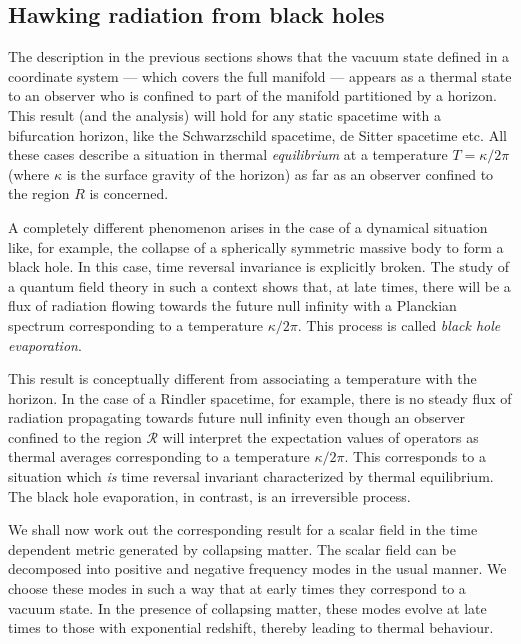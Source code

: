 \documentclass[12pt]{iopart}
\begin{document}
     
 
\subsection{Hawking radiation from black holes}\label{sec:hawrad}

The description in the previous sections shows that
the vacuum state defined in a coordinate system ---  which covers the full manifold --- appears
as a thermal state to an observer who is confined to part of the manifold
partitioned by a horizon. 
This result (and the analysis)  will hold for
any static spacetime 
with a bifurcation horizon, like the Schwarzschild spacetime, de Sitter spacetime etc.
All these cases describe a situation in    thermal \textit{equilibrium} at a temperature 
$T= \kappa/2\pi$ (where $\kappa$ is the surface gravity of the horizon) as far as an 
observer confined to the region $R$ is concerned.

A completely different phenomenon arises in the case of a dynamical situation like, for example, the collapse of  a spherically symmetric massive body to form a black hole.
In this case, time reversal invariance is explicitly broken.
The study of a quantum field theory in such a context shows that, at late times,
there will be a flux of radiation flowing towards the future null infinity
with a Planckian spectrum corresponding to a temperature $\kappa/2\pi$.
 This process is called \textit{black hole evaporation}.
 
 
 This result is conceptually different from associating a temperature with the horizon.
In the case of a Rindler spacetime, for example, there is no steady flux of radiation
propagating towards future null infinity even though an observer confined to
the region $\mathcal{R}$ will interpret the expectation values of operators as thermal averages
corresponding to a temperature $\kappa/2\pi$. This corresponds to a situation
which \textit{is} time reversal invariant characterized by thermal equilibrium.
The black hole evaporation, in contrast, is an irreversible process. 


We shall now work out the corresponding result for  a scalar field in the
time dependent  metric generated by
 collapsing matter. The scalar field can be decomposed into positive and negative frequency
modes in the usual manner. 
We choose these modes in such a way that at early times they  correspond to a vacuum state.
 In the presence of collapsing matter, these modes evolve 
at late times to those with exponential redshift, thereby
 leading 
   to  thermal behaviour. 
\end{document}
